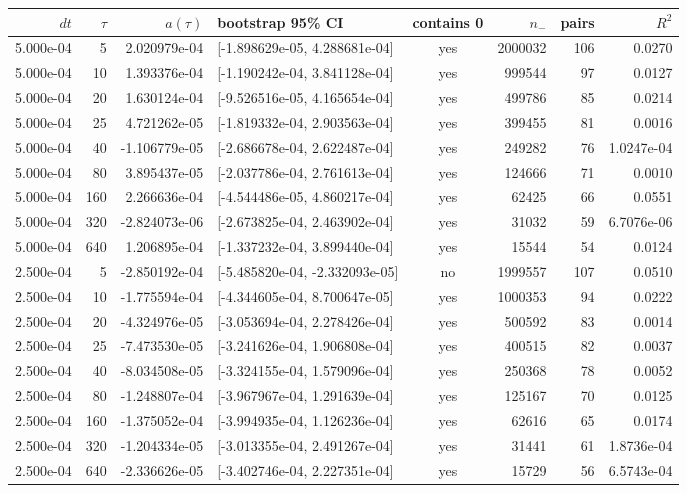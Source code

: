 \documentclass[10pt]{article}
\begin{document}
\scriptsize
\begin{longtable}{r r r l c r r r}
\toprule
$dt$ & $\tau$ & $a(\tau)$ & bootstrap 95\% CI & contains 0 & $n_-$ & pairs & $R^2$\\
\midrule
\endfirsthead
5.000e-04 & 5 & 2.020979e-04 & [-1.898629e-05, 4.288681e-04] & yes & 2000032 & 106 & 0.0270 \\
5.000e-04 & 10 & 1.393376e-04 & [-1.190242e-04, 3.841128e-04] & yes & 999544 & 97 & 0.0127 \\
5.000e-04 & 20 & 1.630124e-04 & [-9.526516e-05, 4.165654e-04] & yes & 499786 & 85 & 0.0214 \\
5.000e-04 & 25 & 4.721262e-05 & [-1.819332e-04, 2.903563e-04] & yes & 399455 & 81 & 0.0016 \\
5.000e-04 & 40 & -1.106779e-05 & [-2.686678e-04, 2.622487e-04] & yes & 249282 & 76 & 1.0247e-04 \\
5.000e-04 & 80 & 3.895437e-05 & [-2.037786e-04, 2.761613e-04] & yes & 124666 & 71 & 0.0010 \\
5.000e-04 & 160 & 2.266636e-04 & [-4.544486e-05, 4.860217e-04] & yes & 62425 & 66 & 0.0551 \\
5.000e-04 & 320 & -2.824073e-06 & [-2.673825e-04, 2.463902e-04] & yes & 31032 & 59 & 6.7076e-06 \\
5.000e-04 & 640 & 1.206895e-04 & [-1.337232e-04, 3.899440e-04] & yes & 15544 & 54 & 0.0124 \\
2.500e-04 & 5 & -2.850192e-04 & [-5.485820e-04, -2.332093e-05] & no & 1999557 & 107 & 0.0510 \\
2.500e-04 & 10 & -1.775594e-04 & [-4.344605e-04, 8.700647e-05] & yes & 1000353 & 94 & 0.0222 \\
2.500e-04 & 20 & -4.324976e-05 & [-3.053694e-04, 2.278426e-04] & yes & 500592 & 83 & 0.0014 \\
2.500e-04 & 25 & -7.473530e-05 & [-3.241626e-04, 1.906808e-04] & yes & 400515 & 82 & 0.0037 \\
2.500e-04 & 40 & -8.034508e-05 & [-3.324155e-04, 1.579096e-04] & yes & 250368 & 78 & 0.0052 \\
2.500e-04 & 80 & -1.248807e-04 & [-3.967967e-04, 1.291639e-04] & yes & 125167 & 70 & 0.0125 \\
2.500e-04 & 160 & -1.375052e-04 & [-3.994935e-04, 1.126236e-04] & yes & 62616 & 65 & 0.0174 \\
2.500e-04 & 320 & -1.204334e-05 & [-3.013355e-04, 2.491267e-04] & yes & 31441 & 61 & 1.8736e-04 \\
2.500e-04 & 640 & -2.336626e-05 & [-3.402746e-04, 2.227351e-04] & yes & 15729 & 56 & 6.5743e-04 \\
\bottomrule
\end{longtable}
\end{document}
